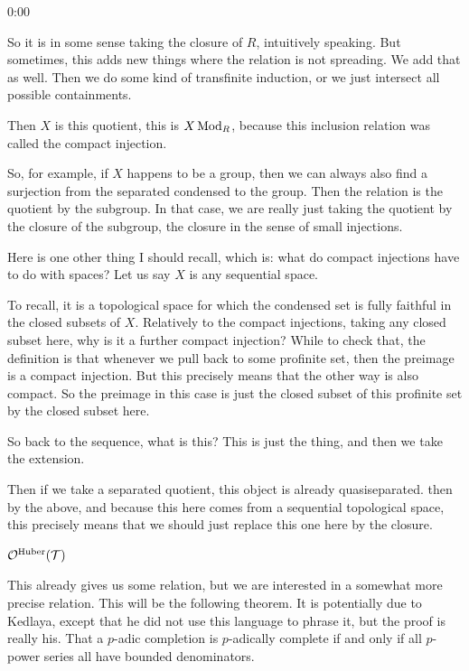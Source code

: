 \begin{unfinished}{0:00}
{\begin{theorem}
So it is in some sense taking the closure of $R$, intuitively speaking. But sometimes, this adds new things where the relation is not spreading. We add that as well. Then we do some kind of transfinite induction, or we just intersect all possible containments.

%
Then $X$ is this quotient, this is $X \operatorname{Mod}_R$, because this inclusion relation was called the compact injection. 

\begin{example}
So, for example, if $X$ happens to be a group, then we can always also find a surjection from the separated condensed to the group. Then the relation is the quotient by the subgroup. In that case, we are really just taking the quotient by the closure of the subgroup, the closure in the sense of small injections.
\end{example}


%
Here is one other thing I should recall, which is: what do compact injections have to do with spaces? Let us say $X$ is any sequential space. 

To recall, it is a topological space for which the condensed set is fully faithful in the closed subsets of $X$. Relatively to the compact injections, taking any closed subset here, why is it a further compact injection? 
While to check that, the definition is that whenever we pull back to some profinite set, then the preimage is a compact injection.  But this precisely means that the other way is also compact. So the preimage in this case is just the closed subset of this profinite set by the closed subset here.

%
So back to the sequence, what is this? This is just the thing, and then we take the extension.

Then if we take a separated quotient, this object  is already quasiseparated. then by the above, and because this here comes from a sequential topological space, this precisely means that we should just replace this one here by the closure. 

$\mathcal O^{\mathrm{Huber}} (\mathcal T)$

%
This already gives us some relation, but we are interested in a somewhat more precise relation. This will be the following theorem. It is potentially due to Kedlaya, except that he did not use this language to phrase it, but the proof is really his. 
That a $p$-adic completion is $p$-adically complete if and only if all $p$-power series all have bounded denominators. 


\end{theorem}}
\end{unfinished}
